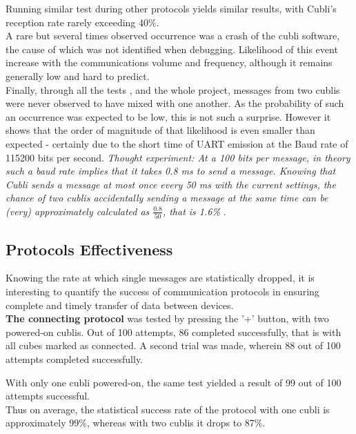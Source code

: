 Running similar test during other protocols yields similar results, with Cubli's reception rate rarely exceeding 40\%.\\

A rare but several times observed occurrence was a crash of the cubli software, the cause of which was not identified when debugging. Likelihood of this event increase with the communications volume and frequency, although it remains generally low and hard to predict.\\

Finally, through all the tests , and the whole project, messages from two cublis were never observed to have mixed with one another. As the probability of such an occurrence was expected to be low, this is not such a surprise. However it shows that the order of magnitude of that likelihood is even smaller than expected - certainly due to the short time of UART emission at the Baud rate of 115200 bits per second. \textit{ Thought experiment: At a 100 bits per message, in theory such a baud rate implies that it takes 0.8 ms to send a message. Knowing that Cubli sends a message at most once every 50 ms with the current settings, the chance of two cublis accidentally sending a message at the same time can be (very) approximately calculated as $\frac{0.8}{50}$, that is 1.6\% }.

\subsection{Protocols Effectiveness}

Knowing the rate at which single messages are statistically dropped, it is interesting to quantify the success of communication protocols in ensuring complete and timely transfer of data between devices. \\

\textbf{The connecting protocol} was tested by pressing the '+' button, with two powered-on cublis. Out of 100 attempts, 86 completed successfully, that is with all cubes marked as connected. A second trial was made, wherein 88 out of 100 attempts completed successfully.

With only one cubli powered-on, the same test yielded a result of 99 out of 100 attempts successful.\\

Thus on average, the statistical success rate of the protocol with one cubli is approximately 99\%, whereas with two cublis it drops to 87\%. \\

